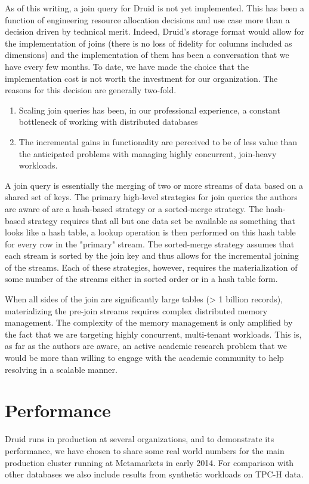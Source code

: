 \documentclass{acm_proc_article-sp}
\begin{document}
As of this writing, a join query for Druid is not yet implemented.  This has
been a function of engineering resource allocation decisions and use case more
than a decision driven by technical merit.  Indeed, Druid's storage format
would allow for the implementation of joins (there is no loss of fidelity for
columns included as dimensions) and the implementation of them has been a
conversation that we have every few months.  To date, we have made the choice
that the implementation cost is not worth the investment for our organization.
The reasons for this decision are generally two-fold.

\begin{enumerate}
\item Scaling join queries has been, in our professional experience, a constant bottleneck of working with distributed databases
\item The incremental gains in functionality are perceived to be of less value than the anticipated problems with managing highly concurrent, join-heavy workloads.
\end{enumerate}

A join query is essentially the merging of two or more streams of data based on
a shared set of keys.  The primary high-level strategies for join queries the
authors are aware of are a hash-based strategy or a sorted-merge strategy.  The
hash-based strategy requires that all but one data set be available as
something that looks like a hash table, a lookup operation is then performed on
this hash table for every row in the "primary" stream.  The sorted-merge
strategy assumes that each stream is sorted by the join key and thus allows for
the incremental joining of the streams.  Each of these strategies, however,
requires the materialization of some number of the streams either in sorted
order or in a hash table form.  

When all sides of the join are significantly large tables (> 1 billion records),
materializing the pre-join streams requires complex distributed memory
management.  The complexity of the memory management is only amplified by
the fact that we are targeting highly concurrent, multi-tenant workloads.
This is, as far as the authors are aware, an active academic research
problem that we would be more than willing to engage with the academic
community to help resolving in a scalable manner.


\section{Performance}
\label{sec:benchmarks}
Druid runs in production at several organizations, and to demonstrate its
performance, we have chosen to share some real world numbers for the main production
cluster running at Metamarkets in early 2014. For comparison with other databases
we also include results from synthetic workloads on TPC-H data.
\end{document}
